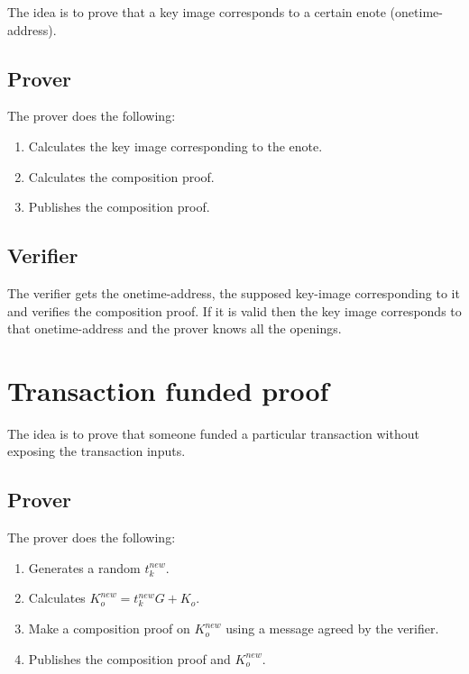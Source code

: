 \documentclass[usletter,11pt,english,oneside,onecolumn,final,openany]{report}
\begin{document}
The idea is to prove that a key image corresponds to a certain enote (onetime-address).

\subsection{Prover}

The prover does the following:

\begin{enumerate}
    \item Calculates the key image corresponding to the enote.
    \item Calculates the composition proof.
    \item Publishes the composition proof.
\end{enumerate}
	
\subsection{Verifier}

The verifier gets the onetime-address, the supposed key-image corresponding to it and verifies the composition proof. If it is valid then the key image corresponds to that onetime-address and the prover knows all the openings.


\section{Transaction funded proof}

The idea is to prove that someone funded a particular transaction without exposing the transaction inputs.

\subsection{Prover}

The prover does the following:

\begin{enumerate}
    \item Generates a random $t_k^{new}$.
    \item Calculates $K_o^{new} = t_k^{new} G + K_o$.
    \item Make a composition proof on $K_o^{new}$ using a message agreed by the verifier.
    \item Publishes the composition proof and $K_o^{new}$.
\end{enumerate}
	
\end{document}

